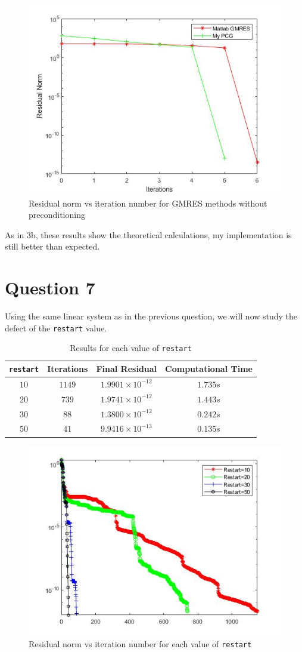\documentclass[a4paper, 11pt]{article}
\begin{document}
			\begin{figure}[H]
				\centering
				\includegraphics[width=.6\linewidth]{ex6b.jpg}
				\caption{Residual norm vs iteration number for GMRES methods without preconditioning}
				\label{fig:ex6_c_NoPrec}
			\end{figure}
		
			As in 3b, these results show the theoretical calculations, my implementation is still better than expected.				
		
		\section*{Question 7}
		
			Using the same linear system as in the previous question, we will now study the defect of the \texttt{restart} value.
			\begin{table}[H]
				\centering
				\begin{tabular}{c|c|c|c}
					\texttt{\textbf{restart}} &  \textbf{Iterations} 	& \textbf{Final Residual} 		& \textbf{Computational Time} 	\\ \hline
					$ 10 $			& 			$1149$ 		& $ 1.9901 \times 10^{-12} $ 	& $ 1.735 s $	\\ \hline	
					$ 20 $			& 			$739$		& $ 1.9741 \times 10^{-12} $	& $ 1.443 s $	\\ \hline
					$ 30 $			& 			$88$ 		& $ 1.3800 \times 10^{-12} $ 	& $ 0.242 s $	\\ \hline	
					$ 50 $			& 			$41$		& $ 9.9416 \times 10^{-13} $	& $ 0.135 s $	\\
				\end{tabular}
				\caption{Results for each value of \texttt{restart}}
				\label{table:ex7}
			\end{table}
			
			\begin{figure}[H]
				\centering
				\includegraphics[width=.6\linewidth]{ex7.jpg}
				\caption{Residual norm vs iteration number for each value of \texttt{restart}}
				\label{fig:ex7}
			\end{figure}
			
\end{document}
